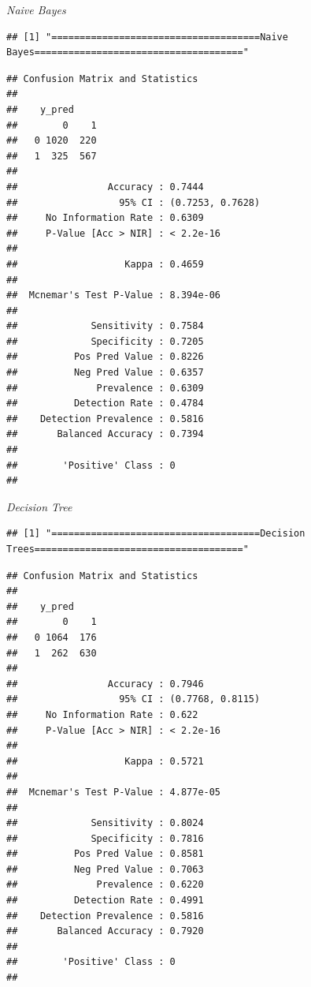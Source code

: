 \documentclass[
]{article}
\begin{document}
\emph{Naive Bayes}

\begin{verbatim}
## [1] "=====================================Naive Bayes====================================="
\end{verbatim}

\begin{verbatim}
## Confusion Matrix and Statistics
## 
##    y_pred
##        0    1
##   0 1020  220
##   1  325  567
##                                           
##                Accuracy : 0.7444          
##                  95% CI : (0.7253, 0.7628)
##     No Information Rate : 0.6309          
##     P-Value [Acc > NIR] : < 2.2e-16       
##                                           
##                   Kappa : 0.4659          
##                                           
##  Mcnemar's Test P-Value : 8.394e-06       
##                                           
##             Sensitivity : 0.7584          
##             Specificity : 0.7205          
##          Pos Pred Value : 0.8226          
##          Neg Pred Value : 0.6357          
##              Prevalence : 0.6309          
##          Detection Rate : 0.4784          
##    Detection Prevalence : 0.5816          
##       Balanced Accuracy : 0.7394          
##                                           
##        'Positive' Class : 0               
## 
\end{verbatim}

\emph{Decision Tree}

\begin{verbatim}
## [1] "=====================================Decision Trees====================================="
\end{verbatim}

\begin{verbatim}
## Confusion Matrix and Statistics
## 
##    y_pred
##        0    1
##   0 1064  176
##   1  262  630
##                                           
##                Accuracy : 0.7946          
##                  95% CI : (0.7768, 0.8115)
##     No Information Rate : 0.622           
##     P-Value [Acc > NIR] : < 2.2e-16       
##                                           
##                   Kappa : 0.5721          
##                                           
##  Mcnemar's Test P-Value : 4.877e-05       
##                                           
##             Sensitivity : 0.8024          
##             Specificity : 0.7816          
##          Pos Pred Value : 0.8581          
##          Neg Pred Value : 0.7063          
##              Prevalence : 0.6220          
##          Detection Rate : 0.4991          
##    Detection Prevalence : 0.5816          
##       Balanced Accuracy : 0.7920          
##                                           
##        'Positive' Class : 0               
## 
\end{verbatim}
\end{document}
